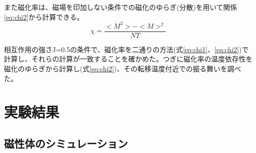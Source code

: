 \documentclass[11pt,a4]{jarticle}
\begin{document}
また磁化率は、磁場を印加しない条件での磁化のゆらぎ(分散)を用いて関係\ref{eq:chi2}から計算できる。
\begin{equation}
\chi = \frac{ <M^2> - <M>^2}{N T}
  \label{eq:chi2}
\end{equation}

相互作用の強さJ=0.5の条件で、磁化率を二通りの方法(式\ref{eq:chi1}、\ref{eq:chi2})で計算し、それらの計算が一致することを確かめた。つぎに磁化率の温度依存性を磁化のゆらぎから計算し(式\ref{eq:chi2})、その転移温度付近での振る舞いを調べた。

\section{実験結果}
\subsection{磁性体のシミュレーション}
\end{document}
